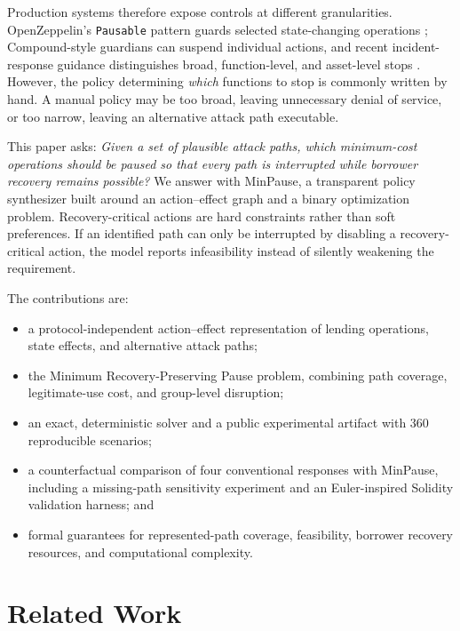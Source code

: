 \documentclass[sn-vancouver,Numbered]{sn-jnl}
\newcommand{\ScenarioCount}{360}
\begin{document}
Production systems therefore expose controls at different granularities.  OpenZeppelin's \texttt{Pausable} pattern guards selected state-changing operations \cite{openzeppelin2023ir,openzeppelin2026pausable}; Compound-style guardians can suspend individual actions, and recent incident-response guidance distinguishes broad, function-level, and asset-level stops \cite{owasp2026circuit}.  However, the policy determining \emph{which} functions to stop is commonly written by hand.  A manual policy may be too broad, leaving unnecessary denial of service, or too narrow, leaving an alternative attack path executable.

This paper asks: \emph{Given a set of plausible attack paths, which minimum-cost operations should be paused so that every path is interrupted while borrower recovery remains possible?}  We answer with MinPause, a transparent policy synthesizer built around an action--effect graph and a binary optimization problem.  Recovery-critical actions are hard constraints rather than soft preferences.  If an identified path can only be interrupted by disabling a recovery-critical action, the model reports infeasibility instead of silently weakening the requirement.

The contributions are:
\begin{itemize}
  \item a protocol-independent action--effect representation of lending operations, state effects, and alternative attack paths;
  \item the Minimum Recovery-Preserving Pause problem, combining path coverage, legitimate-use cost, and group-level disruption;
  \item an exact, deterministic solver and a public experimental artifact with \ScenarioCount{} reproducible scenarios;
  \item a counterfactual comparison of four conventional responses with MinPause, including a missing-path sensitivity experiment and an Euler-inspired Solidity validation harness; and
  \item formal guarantees for represented-path coverage, feasibility, borrower recovery resources, and computational complexity.
\end{itemize}

\section{Related Work}
\end{document}

